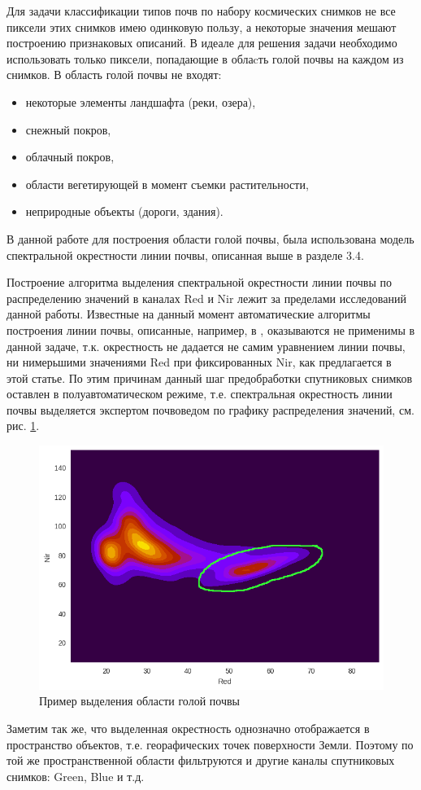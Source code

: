 \documentclass[14pt]{extarticle}
\begin{document}
\par
Для задачи классификации типов почв по набору космических снимков не все пиксели этих снимков
имею одинковую пользу, а некоторые значения мешают построению признаковых описаний. В идеале
для решения задачи необходимо использовать только пиксели, попадающие в облаcть голой почвы
на каждом из снимков. В область голой почвы не входят:
\begin{itemize}
    \item некоторые элементы ландшафта (реки, озера),
    \item снежный покров,
    \item облачный покров,
    \item области вегетирующей в момент съемки растительности,
    \item неприродные объекты (дороги, здания).
\end{itemize}
В данной работе для построения области голой почвы, была использована
модель спектральной окрестности линии почвы, описанная выше в разделе 3.4.
\par
Построение алгоритма выделения спектральной окрестности линии почвы по распределению 
значений в каналах Red и Nir лежит за пределами исследований данной работы. Известные на данный
момент автоматические алгоритмы построения линии почвы, 
описанные, например, в \cite{soil-line-5},
оказываются не применимы в данной задаче, т.к. окрестность не дадается не самим уравнением линии
почвы, ни нимерьшими значениями Red при фиксированных Nir, как предлагается в этой статье.
По этим причинам данный шаг предобработки спутниковых снимков оставлен в полуавтоматическом режиме,
т.е. спектральная окрестность линии почвы выделяется экспертом почвоведом по графику распределения
значений, см. рис. \ref{image:soil_line_plot}.
\begin{figure}[H]
\centering
    \includegraphics[width=\linewidth]{imgs/soil_line_plot.png}
\caption{Пример выделения области голой почвы}
\label{image:soil_line_plot}
\end{figure}
\par
Заметим так же, что выделенная окрестность однозначно отображается в пространство объектов,
т.е. георафических точек поверхности Земли. Поэтому по той же пространственной области
фильтруются и другие каналы спутниковых снимков: Green, Blue и т.д.
\end{document}
